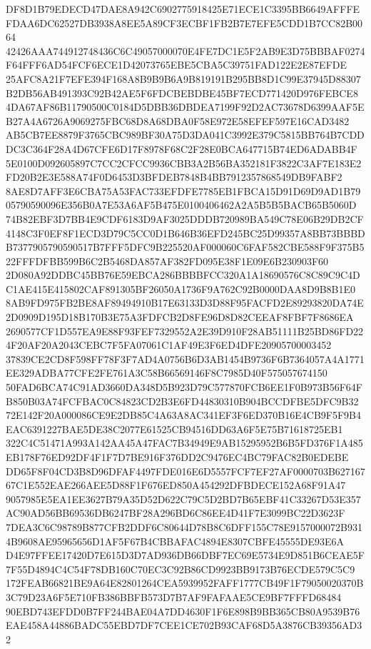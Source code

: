 \documentclass[UTF8,fontset=fandol,zihao=-4,a4paper]{ctexart}
\begin{document}
{{DF8D1B79EDECD47DAE8A942C6902775918425E71ECE1C3395BB6649AFFFEFDAA6DC62527DB3938A8EE5A89CF3ECBF1FB2B7E7EFE5CDD1B7CC82B0064
42426AAA744912748436C6C49057000070E4FE7DC1E5F2AB9E3D75BBBAF0274F64FFF6AD54FCF6ECE1D42073765EBE5CBA5C39751FAD122E2E87EFDE
25AFC8A21F7EFE394F168A8B9B9B6A9B819191B295BB8D1C99E37945D88307B2DB56AB491393C92B42AE5F6FDCBEBDBE45BF7ECD771420D976FEBCE8
4DA67AF86B11790500C0184D5DBB36DBDEA7199F92D2AC73678D6399AAF5EB27A4A6726A9069275FBC68D8A68DBA0F58E972E58EFEF597E16CAD3482
AB5CB7EE8879F3765CBC989BF30A75D3DA041C3992E379C5815BB764B7CDDDC3C364F28A4D67CFE6D17F8978F68C2F28E0BCA647715B74ED6ADABB4F
5E0100D092605897C7CC2CFCC9936CBB3A2B56BA352181F3822C3AF7E183E2FD20B2E3E588A74F0D6453D3BFDEB7848B4BB7912357868549DB9FABF2
8AE8D7AFF3E6CBA75A53FAC733EFDFE7785EB1FBCA15D91D69D9AD1B7905790590096E356B0A7E53A6AF5B475E0100406462A2A5B5B5BACB65B5060D
74B82EBF3D7BB4E9CDF6183D9AF3025DDDB720989BA549C78E06B29DB2CF4148C3F0EF8F1ECD3D79C5CC0D1B646B36EFD245BC25D99357A8BB73BBBD
B7377905790590517B7FFF5DFC9B225520AF000060C6FAF582CBE588F9F375B522FFFDFBB599B6C2B5468DA857AF382FD095E38F1E09E6B230903F60
2D080A92DDBC45BB76E59EBCA286BBBBFCC320A1A18690576C8C89C9C4DC1AE415E415802CAF891305BF26050A1736F9A762C92B0000DAA8D9B8B1E0
8AB9FD975FB2BE8AF89494910B17E63133D3D88F95FACFD2E89293820DA74E2D0909D195D18B170B3E75A3FDFCB2D8FE96D8D82CEEAF8FBF7F8686EA
2690577CF1D557EA9E88F93FEF7329552A2E39D910F28AB51111B25BD86FD224F20AF20A2043CEBC7F5FA07061C1AF49E3F6ED4DFE20905700003452
37839CE2CD8F598FF78F3F7AD4A0756B6D3AB1454B9736F6B7364057A4A1771EE329ADBA77CFE2FE761A3C58B66569146F8C7985D40F575057674150
50FAD6BCA74C91AD3660DA348D5B923D79C577870FCB6EE1F0B973B56F64FB850B03A74FCFBAC0C84823CD2B3E6FD44830310B904BCCDFBE5DFC9B32
72E142F20A000086CE9E2DB85C4A63A8AC341EF3F6ED370B16E4CB9F5F9B4EAC6391227BAE5DE38C2077E61525CB94516DD63A6F5E75B71618725EB1
322C4C51471A993A142AA45A47FAC7B34949E9AB15295952B6B5FD376F1A485EB178F76ED92DF4F1F7D7BE916F376DD2C9476EC4BC79FAC82B0EDEBE
DD65F8F04CD3B8D96DFAF4497FDE016E6D5557FCF7EF27AF0000703B62716767C1E552EAE266AEE5D88F1F676ED850A454292DFBDECE152A68F91A47
9057985E5EA1EE3627B79A35D52D622C79C5D2BD7B65EBF41C33267D53E357AC90AD56BB69536DB6247BF28A296BD6C86EE4D41F7E3099BC22D3623F
7DEA3C6C98789B877CFB2DDF6C80644D78B8C6DFF155C78E9157000072B9314B9608AE95965656D1AF5F67B4CBBAFAC4894E8307CBFE45555DE93E6A
D4E97FFEE17420D7E615D3D7AD936DB66DBF7EC69E5734E9D851B6CEAE5F7F55D4894C4C54F78DB160C70EC3C92B86CD9923BB9173B76ECDE579C5C9
172FEAB66821BE9A64E82801264CEA5939952FAFF1777CB49F1F79050020370B3C79D23A6F5E710FB386BBFB573D7B7AF9FAFAAE5CE9BF7FFFD68484
90EBD743EFDD0B7FF244BAE04A7DD4630F1F6E898B9BB365CB80A9539B76EAE458A44886BADC55EBD7DF7CEE1CE702B93CAF68D5A3876CB39356AD32
}}
\end{document}
